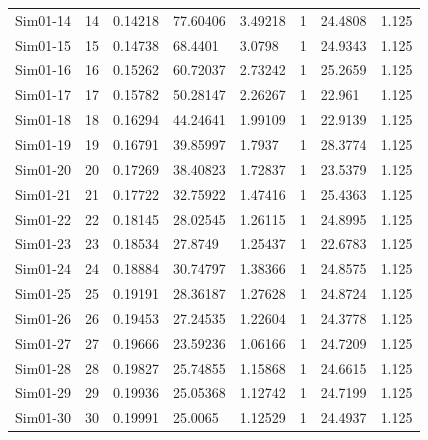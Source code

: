 \documentclass [10pt] {article}
\begin{document}
\begin{table}[h]
\begin{tabular}{c|cllllll}
		Sim01-14 & 14         & 0.14218                         & 77.60406      & 3.49218   & 1              & 24.4808       & 1.125     \\
		Sim01-15 & 15         & 0.14738                         & 68.4401       & 3.0798    & 1              & 24.9343       & 1.125     \\
		Sim01-16 & 16         & 0.15262                         & 60.72037      & 2.73242   & 1              & 25.2659       & 1.125     \\
		Sim01-17 & 17         & 0.15782                         & 50.28147      & 2.26267   & 1              & 22.961        & 1.125     \\
		Sim01-18 & 18         & 0.16294                         & 44.24641      & 1.99109   & 1              & 22.9139       & 1.125     \\
		Sim01-19 & 19         & 0.16791                         & 39.85997      & 1.7937    & 1              & 28.3774       & 1.125     \\
		Sim01-20 & 20         & 0.17269                         & 38.40823      & 1.72837   & 1              & 23.5379       & 1.125     \\
		Sim01-21 & 21         & 0.17722                         & 32.75922      & 1.47416   & 1              & 25.4363       & 1.125     \\
		Sim01-22 & 22         & 0.18145                         & 28.02545      & 1.26115   & 1              & 24.8995       & 1.125     \\
		Sim01-23 & 23         & 0.18534                         & 27.8749       & 1.25437   & 1              & 22.6783       & 1.125     \\
		Sim01-24 & 24         & 0.18884                         & 30.74797      & 1.38366   & 1              & 24.8575       & 1.125     \\
		Sim01-25 & 25         & 0.19191                         & 28.36187      & 1.27628   & 1              & 24.8724       & 1.125     \\
		Sim01-26 & 26         & 0.19453                         & 27.24535      & 1.22604   & 1              & 24.3778       & 1.125     \\
		Sim01-27 & 27         & 0.19666                         & 23.59236      & 1.06166   & 1              & 24.7209       & 1.125     \\
		Sim01-28 & 28         & 0.19827                         & 25.74855      & 1.15868   & 1              & 24.6615       & 1.125     \\
		Sim01-29 & 29         & 0.19936                         & 25.05368      & 1.12742   & 1              & 24.7199       & 1.125     \\
		Sim01-30 & 30         & 0.19991                         & 25.0065       & 1.12529   & 1              & 24.4937       & 1.125    
	\end{tabular}
\end{table}
\end{document}
